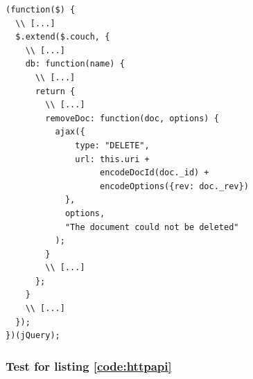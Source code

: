 \lstset{language=javascript}
\medskip 
\begin{lstlisting}[label=code:httpapi, caption=Extract from {\fontfamily{pcr}\selectfont /share/www/script/jquery.couch.js}]
(function($) {
  \\ [...]
  $.extend($.couch, {
    \\ [...]
    db: function(name) {
      \\ [...]
      return {
        \\ [...]
        removeDoc: function(doc, options) {
          ajax({
              type: "DELETE",
              url: this.uri +
                   encodeDocId(doc._id) +
                   encodeOptions({rev: doc._rev})
            },
            options,
            "The document could not be deleted"
          );
        }
        \\ [...]
      };
    }
    \\ [...]
  });
})(jQuery);
\end{lstlisting}


\subsubsection{Test for listing \ref{code:httpapi}}
\label{subsec:testsuite-jspec-code}

